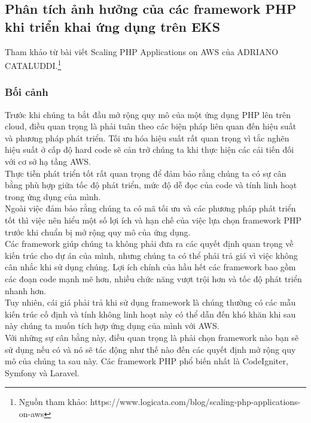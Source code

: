 \subsection{Phân tích ảnh hưởng của các framework PHP khi triển khai ứng dụng trên EKS}
\noindent Tham khảo từ bài viết Scaling PHP Applications on AWS của ADRIANO CATALUDDI.\protect\footnote{Nguồn tham khảo: https://www.logicata.com/blog/scaling-php-applications-on-aws}
\subsubsection{Bối cảnh}
    Trước khi chúng ta bắt đầu mở rộng quy mô của một ứng dụng PHP lên trên cloud, điều quan trọng là phải tuân theo các biện pháp liên quan đến hiệu suất và phương pháp phát triển. Tối ưu hóa hiệu suất rất quan trọng vì tắc nghẽn hiệu suất ở cấp độ hard code sẽ cản trở chúng ta khi thực hiện các cải tiến đối với cơ sở hạ tầng AWS.\\[0.5cm]
    Thực tiễn phát triển tốt rất quan trọng để đảm bảo rằng chúng ta có sự cân bằng phù hợp giữa tốc độ phát triển, mức độ dễ đọc của code và tính linh hoạt trong ứng dụng của mình.\\[0.5cm]
    Ngoài việc đảm bảo rằng chúng ta có mã tối ưu và các phương pháp phát triển tốt thì việc nên hiểu một số lợi ích và hạn chế của việc lựa chọn framework PHP trước khi chuẩn bị mở rộng quy mô của ứng dụng.\\[0.5cm]
    Các framework giúp chúng ta không phải đưa ra các quyết định quan trọng về kiến trúc cho dự án của mình, nhưng chúng ta có thể phải trả giá vì việc không cân nhắc khi sử dụng chúng. Lợi ích chính của hầu hết các framework bao gồm các đoạn code mạnh mẽ hơn, nhiều chức năng vượt trội hơn và tốc độ phát triển nhanh hơn.\\[0.5cm]
    Tuy nhiên, cái giá phải trả khi sử dụng framework là chúng thường có các mẫu kiến trúc cố định và tính không linh hoạt này có thể dẫn đến khó khăn khi sau này chúng ta muốn tích hợp ứng dụng của mình với AWS.\\[0.5cm]
    Với những sự cân bằng này, điều quan trọng là phải chọn framework nào bạn sẽ sử dụng nếu có và nó sẽ tác động như thế nào đến các quyết định mở rộng quy mô của chúng ta sau này. Các framework PHP phổ biến nhất là CodeIgniter, Symfony và Laravel.
